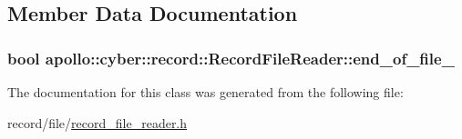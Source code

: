 \subsection{Member Data Documentation}
\hypertarget{classapollo_1_1cyber_1_1record_1_1RecordFileReader_a206e0960c1fc0ec6785f35b6e398f57c}{
\subsubsection[{end\-\_\-of\-\_\-file\-\_\-}]{\setlength{\rightskip}{0pt plus 5cm}bool apollo\-::cyber\-::record\-::\-Record\-File\-Reader\-::end\-\_\-of\-\_\-file\-\_\-\hspace{0.3cm}{\ttfamily [private]}}}\label{classapollo_1_1cyber_1_1record_1_1RecordFileReader_a206e0960c1fc0ec6785f35b6e398f57c}


The documentation for this class was generated from the following file\-:\begin{DoxyCompactItemize}
\item 
record/file/\hyperlink{record__file__reader_8h}{record\-\_\-file\-\_\-reader.\-h}\end{DoxyCompactItemize}
